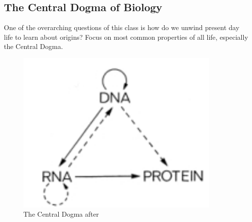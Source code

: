 \documentclass[]{article}
\begin{document}
\subsection{The Central Dogma of Biology}

One of the overarching questions of this class is how do we unwind present day life to learn about origins? Focus on most common properties of all life, especially the Central Dogma.\cite{crick1958biological} \cite{crick1970central}

\begin{figure}[H]
	\caption[The Central Dogma]{The Central Dogma after \cite{crick1970central}}\label{fig:CentralDogma} 
	\includegraphics[width=0.9\textwidth]{CentralDogma}
\end{figure}
\end{document}
